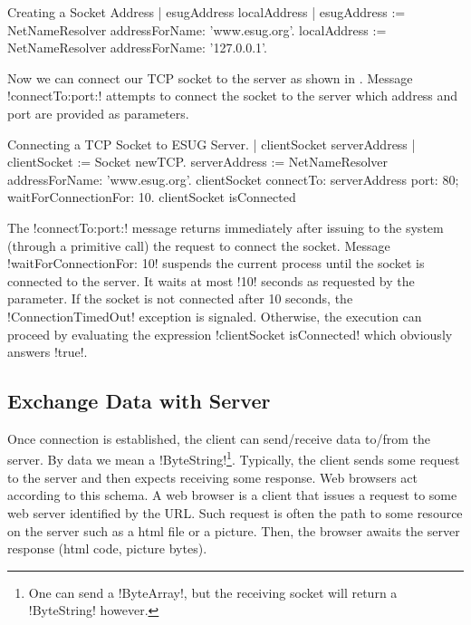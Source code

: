 \documentclass[a4paper,10pt,twoside]{book}
\begin{document}

\begin{script}[creatingSocketAddress]{Creating a Socket Address}
| esugAddress localAddress |
esugAddress := NetNameResolver addressForName: 'www.esug.org'.
localAddress := NetNameResolver addressForName: '127.0.0.1'.
\end{script}

Now we can connect our TCP socket to the server as shown in .
Message \ct!connectTo:port:! attempts to connect the socket to the server which address and port are provided as parameters.

\begin{script}[connectingTcpSocket]{Connecting a TCP Socket to ESUG Server.}
| clientSocket serverAddress |
clientSocket := Socket newTCP.
serverAddress := NetNameResolver addressForName: 'www.esug.org'.
clientSocket 
	connectTo: serverAddress port: 80;
	waitForConnectionFor: 10.
clientSocket isConnected
\end{script}

The \ct!connectTo:port:!  message returns immediately after issuing to the system (through a primitive call) the request to connect the socket.
Message \ct!waitForConnectionFor: 10! suspends the current process until the socket is connected to the server.
It waits at most \ct!10! seconds as requested by the parameter.
If the socket is not connected after 10 seconds, the \ct!ConnectionTimedOut! exception is signaled. 
Otherwise, the execution can proceed by evaluating the expression \ct!clientSocket isConnected! which obviously answers \ct!true!.



\subsection{Exchange Data with Server}
\label{sec:exchangeData}
Once connection is established, the client can send/receive data to/from the server.
By data we mean a \ct!ByteString!\footnote{One can send a \ct!ByteArray!, but the receiving socket will return a \ct!ByteString! however.}.
Typically, the client sends some request to the server and then expects receiving some response.
Web browsers act according to this schema.
A web browser is a client that issues a request to some web server identified by the URL.
Such request is often the path to some resource on the server such as a html file or a picture.
Then, the browser awaits the server response (\eg html code, picture bytes).
\end{document}
